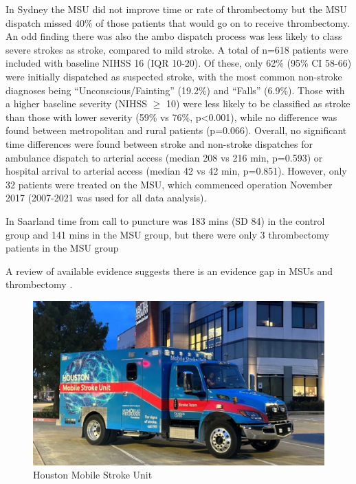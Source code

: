 In Sydney the MSU did not improve time or rate of thrombectomy \cite{haliem_abstract_2023} but the MSU dispatch missed 40\% of those patients that would go on to receive thrombectomy. An odd finding there was also the ambo dispatch process was less likely to class severe strokes as stroke, compared to mild stroke. A total of n=618 patients were included with baseline NIHSS 16 (IQR 10-20). Of these, only 62\% (95\% CI 58-66) were initially dispatched as suspected stroke, with the most common non-stroke diagnoses being “Unconscious/Fainting” (19.2\%) and “Falls” (6.9\%). Those with a higher baseline severity (NIHSS $\ge$ 10) were less likely to be classified as stroke than those with lower severity (59\% vs 76\%, p<0.001), while no difference was found between metropolitan and rural patients (p=0.066). Overall, no significant time differences were found between stroke and non-stroke dispatches for ambulance dispatch to arterial access (median 208 vs 216 min, p=0.593) or hospital arrival to arterial access (median 42 vs 42 min, p=0.851). However, only 32 patients were treated on the MSU, which commenced operation November 2017 (2007-2021 was used for all data analysis). 

In Saarland \cite{helwig_prehospital_2019} time from call to puncture was 183 mins (SD 84) in the control group and 141 mins in the MSU group, but there were only 3 thrombectomy patients in the MSU group


A review of available evidence suggests there is an evidence gap in MSUs and thrombectomy \cite{navi_mobile_2022}.






\begin{figure}
    \centering
    \includegraphics[width=0.5\linewidth]{images_background/houston_msu.jpeg}
    \caption{Houston Mobile Stroke Unit}
    \label{fig:houston_msu}
\end{figure}
